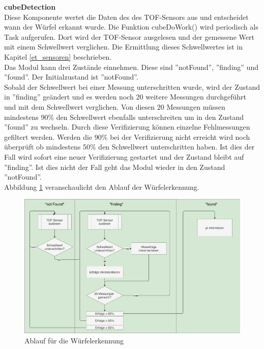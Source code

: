 \documentclass[../../main.tex]{subfiles}
\begin{document}
    \textbf{cubeDetection}\\
    Diese Komponente wertet die Daten des des TOF-Sensors aus und entscheidet wann der Würfel erkannt wurde. Die Funktion cubeDoWork() wird periodisch als Task aufgerufen. Dort wird der TOF-Sensor ausgelesen und der gemessene Wert mit einem Schwellwert verglichen. Die Ermittlung dieses Schwellwertes ist in Kapitel \ref{et_sensoren} beschrieben.\\
    Das Modul kann drei Zustände einnehmen. Diese sind ''notFound'', ''finding'' und ''found''. Der Initialzustand ist ''notFound''.\\
    Sobald der Schwellwert bei einer Messung unterschritten wurde, wird der Zustand in ''finding'' geändert und es werden noch 20 weitere Messungen durchgeführt und mit dem Schwellwert verglichen. Von diesen 20 Messungen müssen mindestens 90\% den Schwellwert ebenfalls unterschreiten um in den Zustand ''found'' zu wechseln. Durch diese Verifizierung können einzelne Fehlmessungen gefiltert werden. Werden die 90\% bei der Verifizierung nicht erreicht wird noch überprüft ob mindestens 50\% den Schwellwert unterschritten haben. Ist dies der Fall wird sofort eine neuer Verifizierung gestartet und der Zustand bleibt auf ''finding''. Ist dies nicht der Fall geht das Modul wieder in den Zustand ''notFound''.\\
    Abbildung \ref{fig:et_cube_detection_proc} veranschaulicht den Ablauf der Würfelerkennung.

    \begin{figure}[H]
        \centering
        \includegraphics[width=1.0\textwidth]{../../images/et/et_cube_detection_proc.pdf}
        \caption {Ablauf für die Würfelerkennung}
        \label{fig:et_cube_detection_proc}
    \end{figure}
\end{document}
